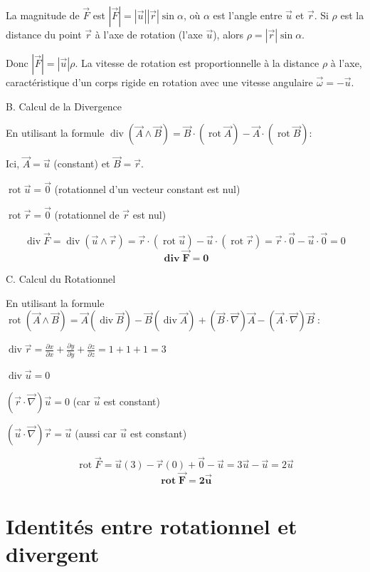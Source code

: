 \documentclass[french]{yLectureNote}
\renewcommand{\vec}{\overrightarrow}
\begin{document}
La magnitude de $\vec{F}$ est $|\vec{F}| = |\vec{u}| |\vec{r}| \sin \alpha$, où $\alpha$ est l'angle entre $\vec{u}$ et $\vec{r}$. Si $\rho$ est la distance du point $\vec{r}$ à l'axe de rotation (l'axe $\vec{u}$), alors $\rho = |\vec{r}| \sin \alpha$.

Donc $|\vec{F}| = |\vec{u}| \rho$. La vitesse de rotation est proportionnelle à la distance $\rho$ à l'axe, caractéristique d'un corps rigide en rotation avec une vitesse angulaire $\vec{\omega} = -\vec{u}$.

B. Calcul de la Divergence

En utilisant la formule $ \operatorname{div}(\vec{A} \wedge \vec{B}) = \vec{B} \cdot (\operatorname{rot}\vec{A}) - \vec{A} \cdot (\operatorname{rot}\vec{B})$:

Ici, $\vec{A}=\vec{u}$ (constant) et $\vec{B}=\vec{r}$.

$\operatorname{rot}\vec{u} = \vec{0}$ (rotationnel d'un vecteur constant est nul)

$\operatorname{rot}\vec{r} = \vec{0}$ (rotationnel de $\vec{r}$ est nul)

$$
\operatorname{div}\vec{F} = \operatorname{div}(\vec{u} \wedge \vec{r}) = \vec{r} \cdot (\operatorname{rot}\vec{u}) - \vec{u} \cdot (\operatorname{rot}\vec{r}) = \vec{r} \cdot \vec{0} - \vec{u} \cdot \vec{0} = 0
$$
$$
\mathbf{\operatorname{div}\vec{F} = 0}
$$

C. Calcul du Rotationnel

En utilisant la formule $\operatorname{rot}(\vec{A} \wedge \vec{B}) = \vec{A} (\operatorname{div}\vec{B}) - \vec{B} (\operatorname{div}\vec{A}) + (\vec{B} \cdot \vec{\nabla})\vec{A} - (\vec{A} \cdot \vec{\nabla})\vec{B}$ :

$\operatorname{div}\vec{r} = \frac{\partial x}{\partial x} + \frac{\partial y}{\partial y} + \frac{\partial z}{\partial z} = 1+1+1 = 3$

$\operatorname{div}\vec{u} = 0$

$(\vec{r} \cdot \vec{\nabla})\vec{u} = 0$ (car $\vec{u}$ est constant)

$(\vec{u} \cdot \vec{\nabla})\vec{r} = \vec{u}$ (aussi car $\vec{u}$ est constant)

$$
\operatorname{rot}\vec{F} = \vec{u}(3) - \vec{r}(0) + \vec{0} - \vec{u} = 3\vec{u} - \vec{u} = 2\vec{u}
$$
$$
\mathbf{\operatorname{rot}\vec{F} = 2\vec{u}}
$$
\section{Identités entre rotationnel et divergent}
\end{document}
